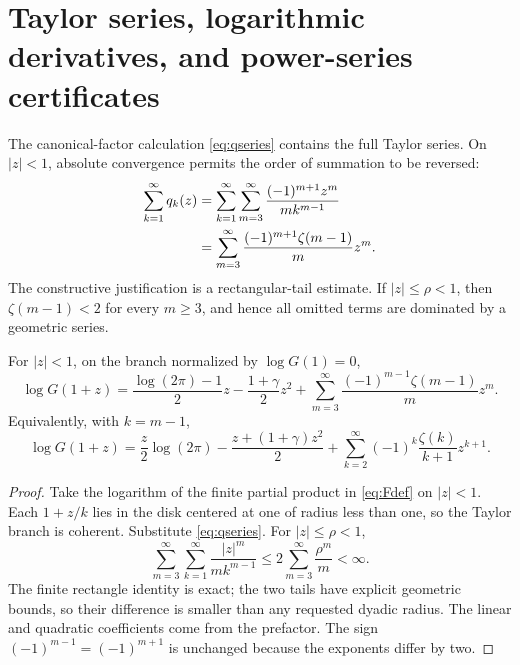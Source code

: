 \section{Taylor series, logarithmic derivatives, and power-series certificates}\label{sec:taylor}

The canonical-factor calculation \cref{eq:qseries} contains the full Taylor
series.  On \(|z|<1\), absolute convergence permits the order of summation to be
reversed:
\begin{align}
 \sum_{k=1}^{\infty}q_k(z)
 &=\sum_{k=1}^{\infty}\sum_{m=3}^{\infty}
   \frac{(-1)^{m+1}z^m}{m k^{m-1}}\notag\\
 &=\sum_{m=3}^{\infty}
   \frac{(-1)^{m+1}\zeta(m-1)}{m}z^m.
 \label{eq:q-double-sum}
\end{align}
The constructive justification is a rectangular-tail estimate.  If
\(|z|\le\rho<1\), then \(\zeta(m-1)<2\) for every \(m\ge3\), and hence all
omitted terms are dominated by a geometric series.

\begin{theorem}\label{thm:taylor}
For \(|z|<1\), on the branch normalized by \(\log G(1)=0\),
\begin{equation}\label{eq:taylor-logG}
 \log G(1+z)
 =\frac{\log(2\pi)-1}{2}z
  -\frac{1+\gamma}{2}z^2
  +\sum_{m=3}^{\infty}
    \frac{(-1)^{m-1}\zeta(m-1)}{m}z^m.
\end{equation}
Equivalently, with \(k=m-1\),
\begin{equation}\label{eq:taylor-wiki}
 \log G(1+z)
 =\frac z2\log(2\pi)
  -\frac{z+(1+\gamma)z^2}{2}
  +\sum_{k=2}^{\infty}
    (-1)^k\frac{\zeta(k)}{k+1}z^{k+1}.
\end{equation}
\end{theorem}

\begin{proof}
Take the logarithm of the finite partial product in \cref{eq:Fdef} on
\(|z|<1\).  Each \(1+z/k\) lies in the disk centered at one of radius less than
one, so the Taylor branch is coherent.  Substitute \cref{eq:qseries}.  For
\(|z|\le\rho<1\),
\[
 \sum_{m=3}^{\infty}\sum_{k=1}^{\infty}
 \frac{|z|^m}{m k^{m-1}}
 \le 2\sum_{m=3}^{\infty}\frac{\rho^m}{m}<\infty.
\]
The finite rectangle identity is exact; the two tails have explicit geometric
bounds, so their difference is smaller than any requested dyadic radius.  The
linear and quadratic coefficients come from the prefactor.  The sign
\((-1)^{m-1}=(-1)^{m+1}\) is unchanged because the exponents differ by two.
\end{proof}

